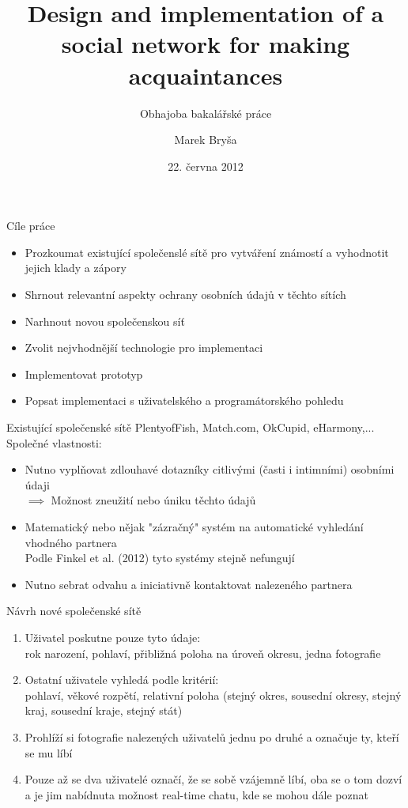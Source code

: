 \documentclass[xcolor=dvipsnames]{beamer}
\title{Design and implementation of a social network for making acquaintances}
\subtitle{Obhajoba bakalářské práce}
\author{Marek Bryša}
\date{22. června 2012}
\institute
{
Masarykova Univerzita\\
Fakulta informatiky
}
\begin{document}
  \frame{\titlepage}
	\begin{frame}{Cíle práce}
		\begin{itemize}
			\item Prozkoumat existující společenslé sítě pro vytváření známostí a vyhodnotit jejich klady a zápory
			\item Shrnout relevantní aspekty ochrany osobních údajů v těchto sítích
			\item Narhnout novou společenskou síť
			\item Zvolit nejvhodnější technologie pro implementaci
			\item Implementovat prototyp
			\item Popsat implementaci s uživatelského a programátorského pohledu
		\end{itemize}
	\end{frame}
	\begin{frame}{Existující společenské sítě}
		PlentyofFish, Match.com, OkCupid, eHarmony,...\\
		\bigskip
		Společné vlastnosti:
		\begin{itemize}
			\item Nutno vyplňovat zdlouhavé dotazníky citlivými (časti i intimními) osobními údaji\\
				$\implies$ Možnost zneužití nebo úniku těchto údajů
			\item Matematický nebo nějak "zázračný" systém na automatické vyhledání vhodného partnera\\
				Podle Finkel et al. (2012) tyto systémy stejně nefungují
			\item Nutno sebrat odvahu a iniciativně kontaktovat nalezeného partnera\\
				
		\end{itemize}
	\end{frame}
	\begin{frame}{Návrh nové společenské sítě}
		\begin{enumerate}
			\item Uživatel poskutne pouze tyto údaje:\\
		    rok narození, pohlaví, přibližná poloha na úroveň okresu, jedna fotografie
	    \item Ostatní uživatele vyhledá podle kritérií:\\
	      pohlaví, věkové rozpětí, relativní poloha (stejný okres, sousední okresy, stejný kraj, sousední kraje, stejný stát)
	    \item Prohlíží si fotografie nalezených uživatelů jednu po druhé a označuje ty, kteří se mu líbí
	    \item Pouze až se dva uživatelé označí, že se sobě vzájemně líbí, oba se o tom dozví a je jim nabídnuta možnost real-time chatu, kde se mohou dále poznat
		\end{enumerate}
	\end{frame}
\end{document}
